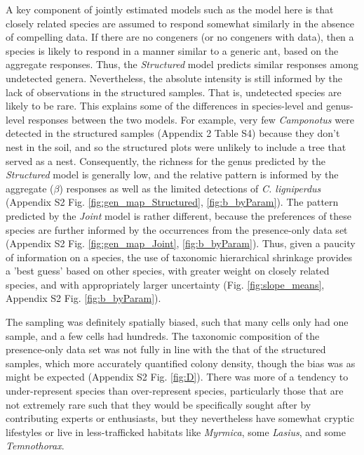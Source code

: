 \documentclass[preprint,review,times,12pt,3p]{elsarticle}
\begin{document}
A key component of jointly estimated models such as the model here is that closely related species are assumed to respond somewhat similarly in the absence of compelling data. If there are no congeners (or no congeners with data), then a species is likely to respond in a manner similar to a generic ant, based on the aggregate responses. Thus, the \emph{Structured} model predicts similar responses among undetected genera. Nevertheless, the absolute intensity is still informed by the lack of observations in the structured samples. That is, undetected species are likely to be rare. This explains some of the differences in species-level and genus-level responses between the two models. For example, very few \emph{Camponotus} were detected in the structured samples (Appendix 2 Table S4) because they don't nest in the soil, and so the structured plots were unlikely to include a tree that served as a nest. Consequently, the richness for the genus predicted by the \emph{Structured} model is generally low, and the relative pattern is informed by the aggregate ($\beta$) responses as well as the limited detections of \emph{C. ligniperdus} (Appendix S2 Fig. \ref{fig:gen_map_Structured}, \ref{fig:b_byParam}). The pattern predicted by the \emph{Joint} model is rather different, because the preferences of these species are further informed by the occurrences from the presence-only data set (Appendix S2 Fig. \ref{fig:gen_map_Joint}, \ref{fig:b_byParam}). Thus, given a paucity of information on a species, the use of taxonomic hierarchical shrinkage provides a 'best guess' based on other species, with greater weight on closely related species, and with appropriately larger uncertainty (Fig. \ref{fig:slope_means}, Appendix S2 Fig. \ref{fig:b_byParam}).

The sampling was definitely spatially biased, such that many cells only had one sample, and a few cells had hundreds. The taxonomic composition of the presence-only data set was not fully in line with the that of the structured samples, which more accurately quantified colony density, though the bias was as might be expected (Appendix S2 Fig. \ref{fig:D}). There was more of a tendency to under-represent species than over-represent species, particularly those that are not extremely rare such that they would be specifically sought after by contributing experts or enthusiasts, but they nevertheless have somewhat cryptic lifestyles or live in less-trafficked habitats like \emph{Myrmica}, some \emph{Lasius}, and some \emph{Temnothorax}. 
\end{document}
